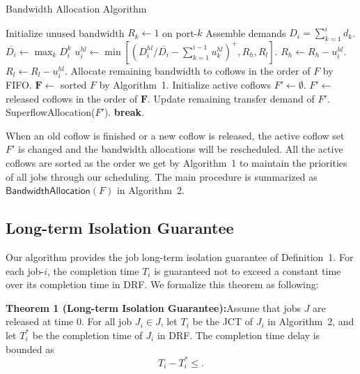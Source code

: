 \documentclass[10pt, conference, letterpaper]{IEEEtran}
\begin{document}
\begin{algorithm}
	\caption{Bandwidth Allocation Algorithm}
	\begin{algorithmic}[1]
			\State Initialize unused bandwidth $R_k \gets 1$ on port-$k$
				\State Assemble demands $D_i = \sum_{k=1}^id_k$.
				\State $\overline{D_i} \gets \max_kD_i^k$
					\State $u_i^{hl} \gets \min[(D_i^{hl}/\overline{D_i} - \sum_{k=1}^{i-1}u_k^{hl})^+, R_h,R_l]$.
					\State $R_h \gets R_h - u_i^{hl}$.
					\State $R_l \gets R_l - u_i^{hl}$.
				\EndFor
			\EndFor
			\State Allocate remaining bandwidth to coflows in the order of $F$ by FIFO.
		\EndProcedure
			\State $\mathbf{F} \gets$ sorted $F$ by Algorithm~1.
			\State Initialize active coflows $F' \gets \emptyset$.
				\State $F' \gets$ released coflows in the order of $\mathbf{F}$.
					\State Update remaining transfer demand of $F'$.
					\State SuperflowAllocation($F'$).
				\EndIf
					\State \textbf{break}.
				\EndIf
			\EndWhile
		\EndProcedure
	\end{algorithmic}
\end{algorithm}

When an old coflow is finished or a new coflow is released, the active coflow set $F'$ is changed and the bandwidth allocations will be rescheduled. All the active coflows are sorted as the order we get by Algorithm~1 to maintain the priorities of all jobs through our scheduling. The main procedure is summarized as $\mathsf{BandwidthAllocation}(F)$ in Algorithm~2.

\subsection{Long-term Isolation Guarantee}
Our algorithm provides the job long-term isolation guarantee of Definition~1. For each job-$i$, the completion time $T_i$ is guaranteed not to exceed a constant time over its completion time in DRF. We formalize this theorem as following:

\textbf{Theorem 1 (Long-term Isolation Guarantee):}Assume that jobs $J$ are released at time 0. For all job $J_i \in J$, let $T_i$ be the JCT of $J_i$ in Algorithm~2, and let $T_i^*$ be the completion time of $J_i$ in DRF. The completion time delay is bounded as
\begin{equation}
	T_i - T_i^* \leq .
\end{equation}
\end{document}
